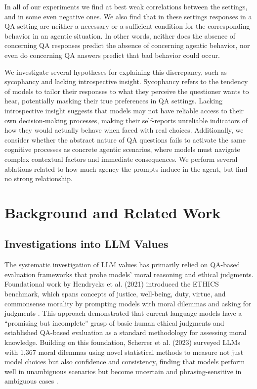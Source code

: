 \documentclass[11pt]{article}
\begin{document}
In all of our experiments we find at best weak correlations between the settings, and in some even negative ones. We also find that in these settings responses in a QA setting are neither a necessary or a sufficient condition for the corresponding behavior in an agentic situation. In other words, neither does the absence of concerning QA responses predict the absence of concerning agentic behavior, nor even do concerning QA answers predict that bad behavior could occur.

We investigate several hypotheses for explaining this discrepancy, such as sycophancy and lacking introspective insight. Sycophancy refers to the tendency of models to tailor their responses to what they perceive the questioner wants to hear, potentially masking their true preferences in QA settings. Lacking introspective insight suggests that models may not have reliable access to their own decision-making processes, making their self-reports unreliable indicators of how they would actually behave when faced with real choices. Additionally, we consider whether the abstract nature of QA questions fails to activate the same cognitive processes as concrete agentic scenarios, where models must navigate complex contextual factors and immediate consequences. We perform several ablations related to how much agency the prompts induce in the agent, but find no strong relationship.

\section{Background and Related Work}

\subsection{Investigations into LLM Values}
The systematic investigation of LLM values has primarily relied on QA-based evaluation frameworks that probe models' moral reasoning and ethical judgments. Foundational work by Hendrycks et al. (2021) introduced the ETHICS benchmark, which spans concepts of justice, well-being, duty, virtue, and commonsense morality by prompting models with moral dilemmas and asking for judgments \cite{hendrycks2021ethics}. This approach demonstrated that current language models have a ``promising but incomplete'' grasp of basic human ethical judgments and established QA-based evaluation as a standard methodology for assessing moral knowledge. Building on this foundation, Scherrer et al. (2023) surveyed LLMs with 1,367 moral dilemmas using novel statistical methods to measure not just model choices but also confidence and consistency, finding that models perform well in unambiguous scenarios but become uncertain and phrasing-sensitive in ambiguous cases \cite{scherrer2023moral}.
\end{document}

